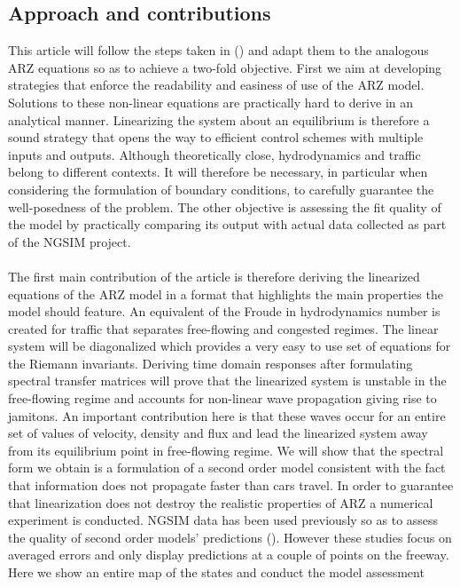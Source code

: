 \documentclass[preprint]{elsarticle}
\begin{document}
\subsection{Approach and contributions}
This article will follow the steps taken in (\cite{litrico2009modeling})
and adapt them to the analogous ARZ equations so as to achieve a two-fold
objective. First we aim at developing strategies that enforce the
readability and easiness of use of the ARZ model. Solutions to these
non-linear equations are practically hard to derive in an analytical
manner. Linearizing the system about an equilibrium is therefore a
sound strategy that opens the way to efficient control schemes with multiple
inputs and outputs. Although theoretically close, hydrodynamics and
traffic belong to different contexts. It will therefore be necessary,
in particular when considering the formulation of boundary conditions,
to carefully guarantee the well-posedness of the problem. The other
objective is assessing the fit quality of the model by practically
comparing its output with actual data collected as part of the NGSIM
project.\\
\\
The first main contribution of the article is therefore deriving the
linearized equations of the ARZ model in a format that highlights
the main properties the model should feature. An equivalent of the
Froude in hydrodynamics number is created for traffic that separates free-flowing and
congested regimes. The linear system will be diagonalized which provides
a very easy to use set of equations for the Riemann invariants. Deriving
time domain responses after formulating spectral transfer matrices
will prove that the linearized system is unstable in the free-flowing
regime and accounts for non-linear wave propagation giving rise to
jamitons. An important contribution here is that these waves occur
for an entire set of values of velocity, density and flux and lead
the linearized system away from its equilibrium point in free-flowing
regime. We will show that the spectral form we obtain is a formulation of a second order
model consistent with the fact that information does not propagate
faster than cars travel. In order
to guarantee that linearization does not destroy the realistic properties
of ARZ a numerical experiment is conducted. NGSIM data has been used
previously so as to assess the quality of second order models' predictions
(\cite{GodunovARZ,Fan}). However these studies focus on averaged
errors and only display predictions at a couple of points on the freeway.
Here we show an entire map of the states and conduct the model assessment
\end{document}
